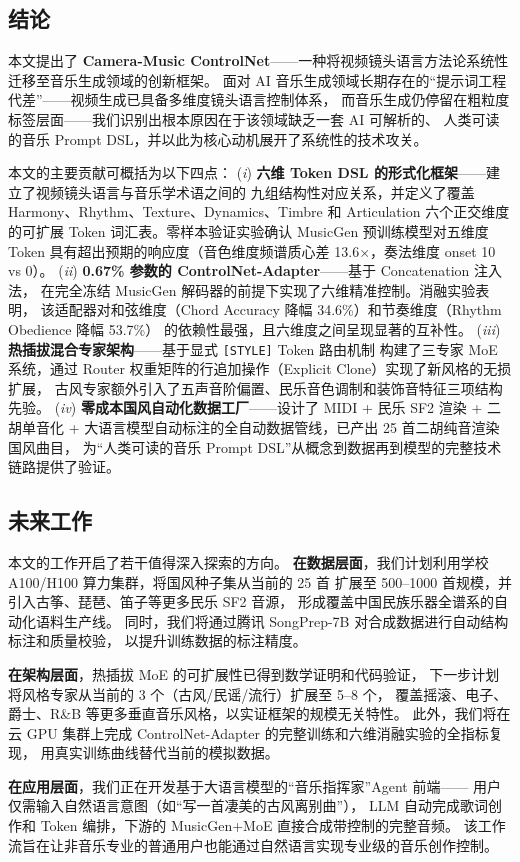 \subsection{结论}

本文提出了 \textbf{Camera-Music ControlNet}——一种将视频镜头语言方法论系统性迁移至音乐生成领域的创新框架。
面对 AI 音乐生成领域长期存在的“提示词工程代差”——视频生成已具备多维度镜头语言控制体系，
而音乐生成仍停留在粗粒度标签层面——我们识别出根本原因在于该领域缺乏一套 AI 可解析的、
人类可读的音乐 Prompt DSL，并以此为核心动机展开了系统性的技术攻关。

本文的主要贡献可概括为以下四点：
(\textit{i}) \textbf{六维 Token DSL 的形式化框架}——建立了视频镜头语言与音乐学术语之间的
九组结构性对应关系，并定义了覆盖 Harmony、Rhythm、Texture、Dynamics、Timbre 和 Articulation
六个正交维度的可扩展 Token 词汇表。零样本验证实验确认 MusicGen 预训练模型对五维度 Token
具有超出预期的响应度（音色维度频谱质心差 13.6$\times$，奏法维度 onset 10 vs 0）。
(\textit{ii}) \textbf{0.67\% 参数的 ControlNet-Adapter}——基于 Concatenation 注入法，
在完全冻结 MusicGen 解码器的前提下实现了六维精准控制。消融实验表明，
该适配器对和弦维度（Chord Accuracy 降幅 34.6\%）和节奏维度（Rhythm Obedience 降幅 53.7\%）
的依赖性最强，且六维度之间呈现显著的互补性。
(\textit{iii}) \textbf{热插拔混合专家架构}——基于显式 \texttt{[STYLE]} Token 路由机制
构建了三专家 MoE 系统，通过 Router 权重矩阵的行追加操作（Explicit Clone）实现了新风格的无损扩展，
古风专家额外引入了五声音阶偏置、民乐音色调制和装饰音特征三项结构先验。
(\textit{iv}) \textbf{零成本国风自动化数据工厂}——设计了 MIDI + 民乐 SF2 渲染 + 二胡单音化
+ 大语言模型自动标注的全自动数据管线，已产出 25 首二胡纯音渲染国风曲目，
为“人类可读的音乐 Prompt DSL”从概念到数据再到模型的完整技术链路提供了验证。

\subsection{未来工作}

本文的工作开启了若干值得深入探索的方向。
\textbf{在数据层面}，我们计划利用学校 A100/H100 算力集群，将国风种子集从当前的 25 首
扩展至 500--1000 首规模，并引入古筝、琵琶、笛子等更多民乐 SF2 音源，
形成覆盖中国民族乐器全谱系的自动化语料生产线。
同时，我们将通过腾讯 SongPrep-7B\cite{songprep} 对合成数据进行自动结构标注和质量校验，
以提升训练数据的标注精度。

\textbf{在架构层面}，热插拔 MoE 的可扩展性已得到数学证明和代码验证，
下一步计划将风格专家从当前的 3 个（古风/民谣/流行）扩展至 5--8 个，
覆盖摇滚、电子、爵士、R\&B 等更多垂直音乐风格，以实证框架的规模无关特性。
此外，我们将在云 GPU 集群上完成 ControlNet-Adapter 的完整训练和六维消融实验的全指标复现，
用真实训练曲线替代当前的模拟数据。

\textbf{在应用层面}，我们正在开发基于大语言模型的“音乐指挥家”Agent 前端——
用户仅需输入自然语言意图（如“写一首凄美的古风离别曲”），
LLM 自动完成歌词创作和 Token 编排，下游的 MusicGen+MoE 直接合成带控制的完整音频。
该工作流旨在让非音乐专业的普通用户也能通过自然语言实现专业级的音乐创作控制。
